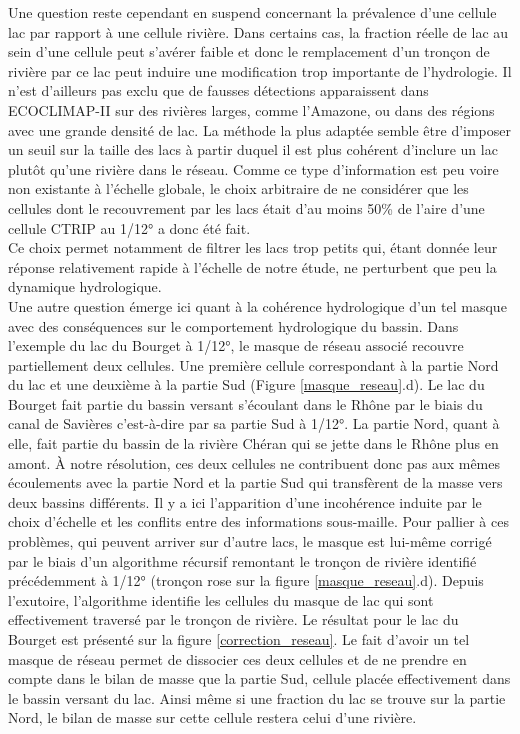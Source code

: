 \noindent Une question reste cependant en suspend concernant la prévalence d'une cellule lac par rapport à une cellule rivière. Dans certains cas, la fraction réelle de lac au sein d'une cellule peut s'avérer faible et donc le remplacement d'un tronçon de rivière par ce lac peut induire une modification trop importante de l'hydrologie. Il n'est d'ailleurs pas exclu que de fausses détections apparaissent dans ECOCLIMAP-II sur des rivières larges, comme l'Amazone, ou dans des régions avec une grande densité de lac. La méthode la plus adaptée semble être d'imposer un seuil sur la taille des lacs à partir duquel il est plus cohérent d'inclure un lac plutôt qu'une rivière dans le réseau. Comme ce type d'information est peu voire non existante à l'échelle globale, le choix arbitraire de ne considérer que les cellules dont le recouvrement par les lacs était d'au moins 50\% de l'aire d'une cellule CTRIP au 1/12° a donc été fait. \\
Ce choix permet notamment de filtrer les lacs trop petits qui, étant donnée leur réponse relativement rapide à l'échelle de notre étude, ne perturbent que peu la dynamique hydrologique. \\

Une autre question émerge ici quant à la cohérence hydrologique d'un tel masque avec des conséquences sur le comportement hydrologique du bassin. Dans l'exemple du lac du Bourget à 1/12°, le masque de réseau associé recouvre partiellement deux cellules. Une première cellule correspondant à la partie Nord du lac et une deuxième à la partie Sud (Figure \ref{masque_reseau}.d). Le lac du Bourget fait partie du bassin versant s'écoulant dans le Rhône par le biais du canal de Savières c'est-à-dire par sa partie Sud à 1/12°. La partie Nord, quant à elle, fait partie du bassin de la rivière Chéran qui se jette dans le Rhône plus en amont. À notre résolution, ces deux cellules ne contribuent donc pas aux mêmes écoulements avec la partie Nord et la partie Sud qui transfèrent de la masse vers deux bassins différents. Il y a ici l'apparition d'une incohérence induite par le choix d'échelle et les conflits entre des informations sous-maille. Pour pallier à ces problèmes, qui peuvent arriver sur d'autre lacs, le masque est lui-même corrigé par le biais d'un algorithme récursif remontant le tronçon de rivière identifié précédemment à 1/12° (tronçon rose sur la figure \ref{masque_reseau}.d). Depuis l'exutoire, l'algorithme identifie les cellules du masque de lac qui sont effectivement traversé par le tronçon de rivière. Le résultat pour le lac du Bourget est présenté sur la figure \ref{correction_reseau}. Le fait d'avoir un tel masque de réseau permet de dissocier ces deux cellules et de ne prendre en compte dans le bilan de masse que la partie Sud, cellule placée effectivement dans le bassin versant du lac. Ainsi même si une fraction du lac se trouve sur la partie Nord, le bilan de masse sur cette cellule restera celui d'une rivière.

